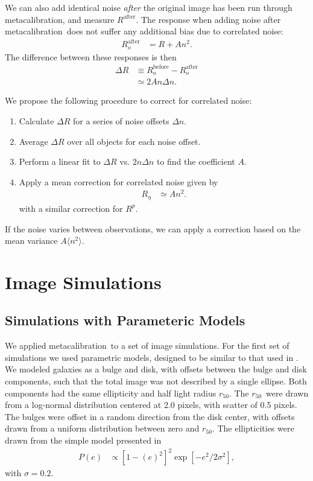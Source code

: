 \documentclass[usegraphicx,usenatbib]{mn2e}
\newcommand{\hlr}{$r_{50}$}
\newcommand{\mcal}{metacalibration}
\newcommand{\mcalRpsf}{$R^{p}$}
\newcommand{\mcalRnoise}{$R_\eta$}
\begin{document}
We can also add identical noise {\em after} the original image  has been run
through \mcal, and measure $R^{\mathrm{after}}$.  The response when adding
noise after \mcal\ does not suffer any additional bias due to correlated noise:
\begin{align}
    R_o^{\mathrm{after}} &= R + A n^2.
\end{align}
The difference between these responses is then 
\begin{align}
    \Delta R &\equiv R_o^{\mathrm{before}} - R_o^{\mathrm{after}}  \nonumber \\
             &\simeq 2 A n \Delta n.
\end{align}

We propose the following procedure to correct for correlated noise:
\begin{enumerate}
    \item Calculate $\Delta R$ for a series of noise offsets $\Delta n$.
    \item Average $\Delta R$ over all objects for each noise offset.
    \item Perform a linear fit to $\Delta R$ vs. $2 n \Delta n$ to find the 
        coefficient $A$.
    \item Apply a mean correction for correlated noise given by
        \begin{align}
            \mbox{\mcalRnoise} & \simeq A n^2.
        \end{align}
        with a similar correction for \mcalRpsf.
\end{enumerate}
If the noise varies between observations, we can apply a 
correction based on the mean variance $A
\langle n^2 \rangle$.


\section{Image Simulations} \label{sec:sims}

\subsection{Simulations with Parameteric Models}

We applied \mcal\ to a set of image simulations.  For the first set of
simulations we used parametric models, designed to be similar to that used in
\citet{bfd2015}.  We modeled galaxies as a bulge and disk, with offsets between the
bulge and disk components, such that the total image was not described by a
single ellipse.  Both components had the same ellipticity and half light radius
\hlr. The \hlr\ were drawn from a log-normal distribution centered at 2.0
pixels, with scatter of 0.5 pixels.  The bulges were offset in a random
direction from the disk center, with offsets drawn from a uniform distribution
between zero and \hlr.  The ellipticities were drawn from the simple model
presented in \cite{ba14}
\begin{align}
    P(e) &\propto \left[1-(e)^2\right]^2 \exp\left[-e^2/2\sigma^2\right],
\end{align}
with $\sigma=0.2$.
\end{document}
